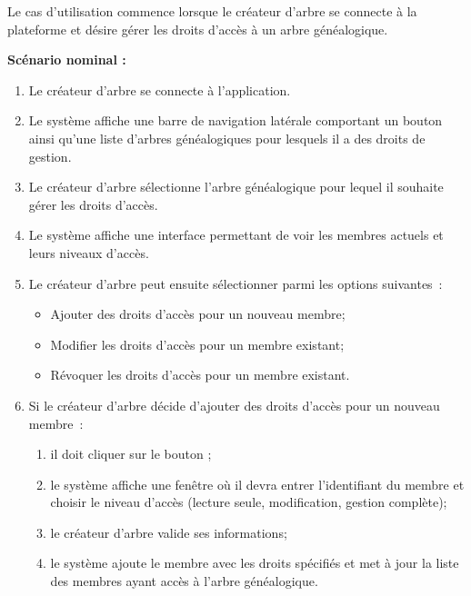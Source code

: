 Le cas d’utilisation commence lorsque le créateur d'arbre se connecte à la
plateforme et désire gérer les droits d'accès à un arbre généalogique.

\textbf{Scénario nominal :}

\begin{enumerate}

  \item  Le créateur d'arbre se connecte à l’application.

  \item Le système affiche une barre de navigation latérale comportant un
    bouton  ainsi qu’une liste d’arbres
    généalogiques pour lesquels il a des droits de gestion.

  \item Le créateur d'arbre sélectionne l'arbre généalogique pour lequel il souhaite
    gérer les droits d'accès.

  \item Le système affiche une interface permettant de voir les membres
    actuels et leurs niveaux d'accès.

  \item Le créateur d'arbre peut ensuite sélectionner parmi les options suivantes :
    \begin{itemize}
      \item Ajouter des droits d'accès pour un nouveau membre;
      \item Modifier les droits d'accès pour un membre existant;
      \item Révoquer les droits d'accès pour un membre existant.
    \end{itemize}

  \item Si le créateur d'arbre décide d'ajouter des droits d'accès pour un nouveau membre :
    \begin{enumerate}
      \item il doit cliquer sur le bouton ;
      \item le système affiche une fenêtre où il devra entrer l'identifiant du
        membre et choisir le niveau d'accès (lecture seule,
        modification, gestion complète);
      \item le créateur d'arbre valide ses informations;
      \item le système ajoute le membre avec les droits spécifiés et met à
        jour la liste des membres ayant accès à l'arbre généalogique.
    \end{enumerate}


\end{enumerate}
